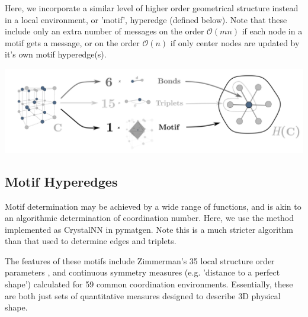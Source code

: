\documentclass[10pt,a4paper]{article}
\begin{document}
Here, we incorporate a similar level of higher order geometrical structure instead in a local environment, or 'motif', hyperedge (defined below). Note that these include only an extra number of messages on the order $\mathcal{O}(mn)$ if each node in a motif gets a message, or on the order $\mathcal{O}(n)$ if only center nodes are updated by it's own motif hyperedge(s).

\begin{center}


\includegraphics[scale=0.13]{revamp2.pdf}

\end{center}


\subsection{Motif Hyperedges}
Motif determination may be achieved by a wide range of functions, and is akin to an algorithmic determination of coordination number. Here, we use the method implemented as CrystalNN in pymatgen. Note this is a much stricter algorithm than that used to determine edges and triplets.


The features of these motifs include Zimmerman's 35 local structure order parameters \cite{orderparam1,orderparam2}, and continuous symmetry measures \cite{csm_polyhedra} (e.g. 'distance to a perfect shape') calculated for 59 common coordination environments. Essentially, these are both just sets of quantitative measures designed to describe 3D physical shape.

\end{document}
